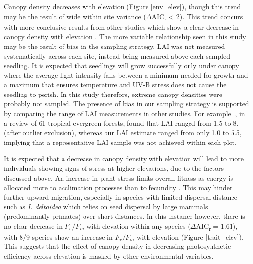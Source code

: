 \documentclass[a4paper, 11pt]{article}
\begin{document}
Canopy density decreases with elevation (Figure \ref{env_elev}), though this trend may be the result of wide within site variance ($\Delta$AIC\textsubscript{r} < 2). This trend concurs with more conclusive results from other studies which show a clear decrease in canopy density with elevation \citep{Kitayama2002, Moser2008}. The more variable relationship seen in this study may be the result of bias in the sampling strategy. LAI was not measured systematically across each site, instead being measured above each sampled seedling. It is expected that seedlings will grow successfully only under canopy where the average light intensity falls between a minimum needed for growth and a maximum that ensures temperature and UV-B stress does not cause the seedling to perish. In this study therefore, extreme canopy densities were probably not sampled. The presence of bias in our sampling strategy is supported by comparing the range of LAI measurements in other studies. For example, \citet{Asner2003}, in a review of 61 tropical evergreen forests, found that LAI ranged from 1.5 to 8. (after outlier exclusion), whereas our LAI estimate ranged from only 1.0 to 5.5, implying that a representative LAI sample was not achieved within each plot.

It is expected that a decrease in canopy density with elevation will lead to more individuals showing signs of stress at higher elevations, due to the factors discussed above. An increase in plant stress limits overall fitness as energy is allocated more to acclimation processes than to fecundity \citep{Reu2011}. This may hinder further upward migration, especially in species with limited dispersal distance such as \textit{I. deltoidea} which relies on seed dispersal by large mammals (predominantly primates) \citep{Russo2005, Kuprewicz2013} over short distances. In this instance however, there is no clear decrease in $F_v/F_m$ with elevation within any species ($\Delta$AIC\textsubscript{r} = 1.61), with 8/9 species show an increase in $F_v/F_m$ with elevation (Figure \ref{trait_elev}). This suggests that the effect of canopy density in decreasing photosynthetic efficiency across elevation is masked by other environmental variables.

\end{document}

